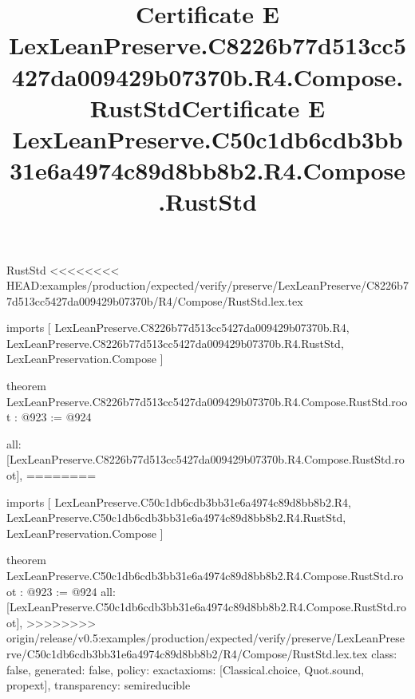 \begin{lexlean}{RustStd}
<<<<<<<< HEAD:examples/production/expected/verify/preserve/LexLeanPreserve/C8226b77d513cc5427da009429b07370b/R4/Compose/RustStd.lex.tex
\title{Certificate E LexLeanPreserve.C8226b77d513cc5427da009429b07370b.R4.Compose.RustStd}
\begin{coremodule}
imports [
  LexLeanPreserve.C8226b77d513cc5427da009429b07370b.R4,
  LexLeanPreserve.C8226b77d513cc5427da009429b07370b.R4.RustStd,
  LexLeanPreservation.Compose
]

theorem LexLeanPreserve.C8226b77d513cc5427da009429b07370b.R4.Compose.RustStd.root : @923 := @924 {
  all: [LexLeanPreserve.C8226b77d513cc5427da009429b07370b.R4.Compose.RustStd.root],
========
\title{Certificate E LexLeanPreserve.C50c1db6cdb3bb31e6a4974c89d8bb8b2.R4.Compose.RustStd}
\begin{coremodule}
imports [
  LexLeanPreserve.C50c1db6cdb3bb31e6a4974c89d8bb8b2.R4,
  LexLeanPreserve.C50c1db6cdb3bb31e6a4974c89d8bb8b2.R4.RustStd,
  LexLeanPreservation.Compose
]

theorem LexLeanPreserve.C50c1db6cdb3bb31e6a4974c89d8bb8b2.R4.Compose.RustStd.root : @923 := @924 {
  all: [LexLeanPreserve.C50c1db6cdb3bb31e6a4974c89d8bb8b2.R4.Compose.RustStd.root],
>>>>>>>> origin/release/v0.5:examples/production/expected/verify/preserve/LexLeanPreserve/C50c1db6cdb3bb31e6a4974c89d8bb8b2/R4/Compose/RustStd.lex.tex
  class: false,
  generated: false,
  policy: exact{axioms: [Classical.choice, Quot.sound, propext]},
  transparency: semireducible
}


\end{coremodule}}
\end{coremodule}
\end{lexlean}
